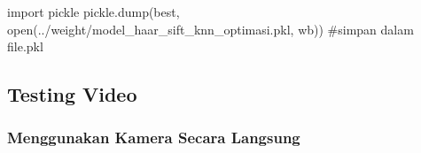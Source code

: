 \documentclass[
  letterpaper,
  DIV=11,
  numbers=noendperiod]{scrreprt}
\newenvironment{Shaded}{\begin{snugshade}}{\end{snugshade}}
\newcommand{\BuiltInTok}[1]{\textcolor[rgb]{0.00,0.23,0.31}{#1}}
\newcommand{\CommentTok}[1]{\textcolor[rgb]{0.37,0.37,0.37}{#1}}
\newcommand{\ImportTok}[1]{\textcolor[rgb]{0.00,0.46,0.62}{#1}}
\newcommand{\NormalTok}[1]{\textcolor[rgb]{0.00,0.23,0.31}{#1}}
\newcommand{\StringTok}[1]{\textcolor[rgb]{0.13,0.47,0.30}{#1}}
\begin{document}
\begin{Shaded}
\begin{Highlighting}[]
\ImportTok{import}\NormalTok{ pickle}
\NormalTok{pickle.dump(best, }\BuiltInTok{open}\NormalTok{(}\StringTok{\textquotesingle{}../weight/model\_haar\_sift\_knn\_optimasi.pkl\textquotesingle{}}\NormalTok{, }\StringTok{\textquotesingle{}wb\textquotesingle{}}\NormalTok{)) }\CommentTok{\#simpan dalam file.pkl}
\end{Highlighting}
\end{Shaded}

\hypertarget{testing-video-1}{%
\subsection*{Testing Video}\label{testing-video-1}}

\hypertarget{menggunakan-kamera-secara-langsung-1}{%
\subsubsection*{Menggunakan Kamera Secara
Langsung}\label{menggunakan-kamera-secara-langsung-1}}
\end{document}
